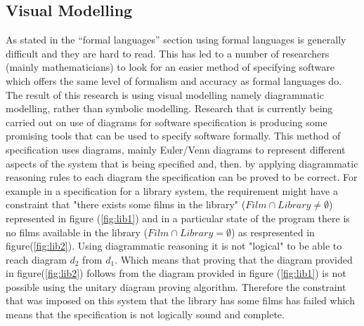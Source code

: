 \documentclass[10pt, a4paper, titlepage]{article}
\begin{document}
\subsection{Visual Modelling}
 
As stated in the “formal languages” section using formal languages is generally difficult and they are hard to read. This has led to a number of researchers (mainly mathematicians) to look for an easier method of specifying software which offers the same level of formalism and accuracy as formal languages do. The result of this research is using visual modelling namely diagrammatic modelling, rather than symbolic modelling. Research that is currently being carried out on use of diagrams for  software specification is producing some promising tools that can be used to specify software formally. This method of specification uses diagrams, mainly Euler/Venn diagrams to represent different aspects of  the system that is being specified and, then. by applying diagrammatic reasoning rules to each diagram the specification can be proved to be correct. For example in a specification for a library system, the requirement might have a constraint that "there exists some films in the library" ($ Film \cap Library \neq \emptyset $)  represented in figure (\ref{fig:lib1}) and in a particular state of the program there is no films available in the library ($ Film \cap Library = \emptyset $) as respresented in figure(\ref{fig:lib2}). Using diagrammatic reasoning it is not "logical" to be able to reach diagram $ d_{2} $ from $ d_{1} $. Which means that proving that the diagram provided in figure(\ref{fig:lib2}) follows from the diagram provided in figure (\ref{fig:lib1}) is not possible using the unitary diagram proving algorithm. Therefore the constraint that was imposed on this system that the library has some films has failed which means that the specification is not logically sound and complete.
\end{document}
